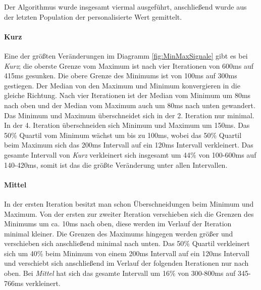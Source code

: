 
Der Algorithmus wurde insgesamt viermal ausgef{\"u}hrt, anschlie{\ss}end wurde aus der letzten Population der personalisierte Wert gemittelt. 

\paragraph{Kurz}
Eine der gr{\"o}{\ss}ten Ver{\"a}nderungen im Diagramm \autoref{fig:MinMaxSignale} gibt es bei \textit{Kurz}; die oberste Grenze vom Maximum ist nach vier Iterationen von 600ms auf 415ms gesunken. 
Die obere Grenze des Minimums ist von 100ms auf 300ms gestiegen. 
Der Median von den Maximum und Minimum konvergieren in die gleiche Richtung. 
Nach vier Iterationen ist der Median vom Minimum um 80ms nach oben und der Median vom Maximum auch um 80ms nach unten gewandert. 
Das Minimum und Maximum {\"u}berschneidet sich in der 2. Iteration nur minimal. 
In der 4. Iteration {\"u}berschneiden sich Minimum und Maximum um 150ms. 
Das 50\% Quartil vom Minimum w{\"a}chst um bis zu 100ms, wobei das 50\% Quartil beim Maximum sich das 200ms Intervall auf ein 120ms Intervall verkleinert. 
Das gesamte Intervall von \textit{Kurz} verkleinert sich insgesamt um 44\% von 100-600ms auf 140-420ms, somit ist das die gr{\"o}{\ss}te Ver{\"a}nderung unter allen Intervallen.



\paragraph{Mittel}
In der ersten Iteration besitzt man schon {\"U}berschneidungen beim Minimum und Maximum. 
Von der ersten zur zweiter Iteration verschieben sich die Grenzen des Minimums um ca. 10ms nach oben, diese werden im Verlauf der Iteration minimal kleiner.  
Die Grenzen des Maximums hingegen werden gr{\"o}{\ss}er und verschieben sich anschlie{\ss}end minimal nach unten. 
Das 50\% Quartil verkleinert sich um 40\% beim Minimum von einem 200ms Intervall auf ein 120ms Intervall und verschiebt sich anschlie{\ss}end im Verlauf der folgenden Iterationen nur nach oben. 
Bei \textit{Mittel} hat sich das gesamte Intervall um 16\% von 300-800ms auf 345-766ms verkleinert.


